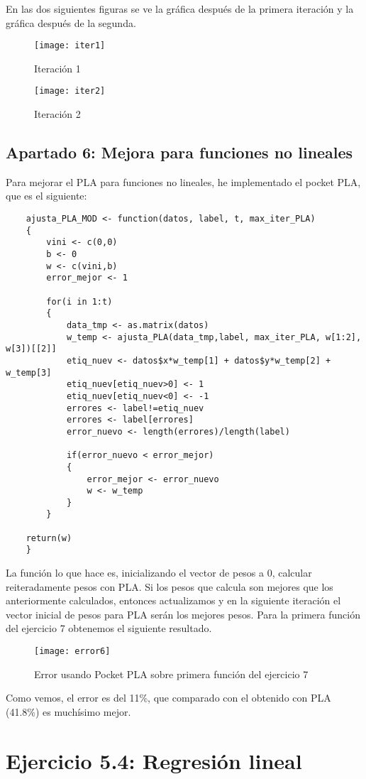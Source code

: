 	En las dos siguientes figuras se ve la gráfica después de la primera iteración y la gráfica después de la segunda.
	\begin{figure}[H]
	\centering
	\texttt{[image: iter1]}
	\caption{Iteración 1}
	\label{fig:iter1}
	\end{figure}
	\begin{figure} [H]
	\centering
	\texttt{[image: iter2]}
	\caption{Iteración 2}
	\label{fig:iter2}
	\end{figure}
	
	\subsection{Apartado 6: Mejora para funciones no lineales}
	Para mejorar el PLA para funciones no lineales, he implementado el pocket PLA, que es el siguiente:
	\begin{lstlisting}
	ajusta_PLA_MOD <- function(datos, label, t, max_iter_PLA)
	{
		vini <- c(0,0)
		b <- 0
		w <- c(vini,b)
		error_mejor <- 1
		
		for(i in 1:t)
		{
			data_tmp <- as.matrix(datos)
			w_temp <- ajusta_PLA(data_tmp,label, max_iter_PLA, w[1:2], w[3])[[2]]
			etiq_nuev <- datos$x*w_temp[1] + datos$y*w_temp[2] + w_temp[3]
			etiq_nuev[etiq_nuev>0] <- 1
			etiq_nuev[etiq_nuev<0] <- -1
			errores <- label!=etiq_nuev
			errores <- label[errores]
			error_nuevo <- length(errores)/length(label)
			
			if(error_nuevo < error_mejor)
			{
				error_mejor <- error_nuevo
				w <- w_temp
			}
		}
	
	return(w)
	}
	\end{lstlisting}
	La función lo que hace es, inicializando el vector de pesos a 0, calcular reiteradamente pesos con PLA. Si los pesos que calcula son mejores que los anteriormente calculados, entonces actualizamos y en la siguiente iteración el vector inicial de pesos para PLA serán los mejores pesos. Para la primera función del ejercicio 7 obtenemos el siguiente resultado.
	\begin{figure}
	\centering
	\texttt{[image: error6]}
	\caption{Error usando Pocket PLA sobre primera función del ejercicio 7}
	\label{fig:error6}
	\end{figure}
	Como vemos, el error es del 11\%, que comparado con el obtenido con PLA (41.8\%) es muchísimo mejor.

	\section{Ejercicio 5.4: Regresión lineal}
